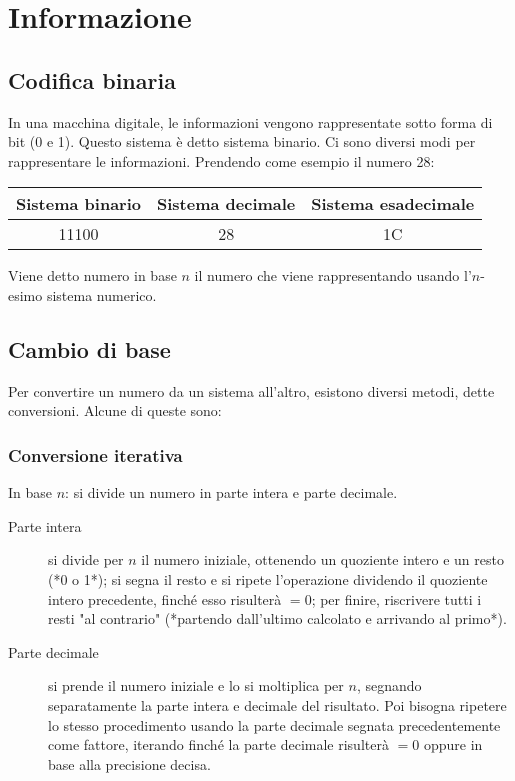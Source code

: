 \documentclass{subfiles}
\begin{document}
\section{Informazione}

\subsection{Codifica binaria}

In una macchina digitale, le informazioni vengono rappresentate sotto forma di bit (0 e 1).
Questo sistema è detto sistema binario.
Ci sono diversi modi per rappresentare le informazioni. Prendendo come esempio il numero 28:

\begin{center}
\begin{tabular}{ |c|c|c| }
\hline
Sistema binario & Sistema decimale & Sistema esadecimale \\
\hline
\hline
11100 & 28 & 1C \\
\hline
\end{tabular}
\end{center}

\noindent
Viene detto numero in base $n$ il numero che viene rappresentando usando l'$n$-esimo sistema numerico.

\subsection{Cambio di base}

Per convertire un numero da un sistema all'altro, esistono diversi metodi, dette conversioni. Alcune di queste sono:

\subsubsection{Conversione iterativa}

In base $n$: si divide un numero in parte intera e parte decimale.

\begin{description}
    \item[Parte intera] si divide per $n$ il numero iniziale, ottenendo un quoziente intero e un resto (*0 o 1*); si segna il resto e si ripete l'operazione dividendo il quoziente intero precedente, finché esso risulterà $= 0$; per finire, riscrivere tutti i resti "al contrario" (*partendo dall'ultimo calcolato e arrivando al primo*).
    \item[Parte decimale] si prende il numero iniziale e lo si moltiplica per $n$, segnando separatamente la parte intera e decimale del risultato. Poi bisogna ripetere lo stesso procedimento usando la parte decimale segnata precedentemente come fattore, iterando finché la parte decimale risulterà $= 0$ oppure in base alla precisione decisa.
\end{description}
\end{document}

